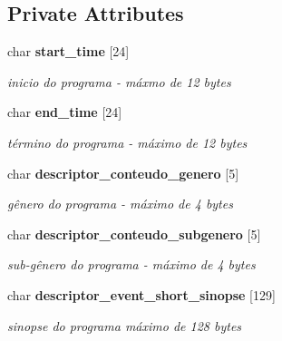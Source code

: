 \subsection*{Private Attributes}
\begin{CompactItemize}
\item 
char {\bf start\_\-time} [24]\label{classbr_1_1ufscar_1_1lince_1_1ginga_1_1recommender_1_1eit_162d6bf0bd2ed5980e8383fa3e7bc3ae}

\begin{CompactList}\small\item\em inicio do programa - máxmo de 12 bytes \item\end{CompactList}\item 
char {\bf end\_\-time} [24]\label{classbr_1_1ufscar_1_1lince_1_1ginga_1_1recommender_1_1eit_6b3d4dbec9451fa4f8452c286c6baa37}

\begin{CompactList}\small\item\em término do programa - máximo de 12 bytes \item\end{CompactList}\item 
char {\bf descriptor\_\-conteudo\_\-genero} [5]\label{classbr_1_1ufscar_1_1lince_1_1ginga_1_1recommender_1_1eit_6425408a35ba7fe43f922c52ca7e88a1}

\begin{CompactList}\small\item\em gênero do programa - máximo de 4 bytes \item\end{CompactList}\item 
char {\bf descriptor\_\-conteudo\_\-subgenero} [5]\label{classbr_1_1ufscar_1_1lince_1_1ginga_1_1recommender_1_1eit_9965d270160e6f06ecb05c94f2447d59}

\begin{CompactList}\small\item\em sub-gênero do programa - máximo de 4 bytes \item\end{CompactList}\item 
char {\bf descriptor\_\-event\_\-short\_\-sinopse} [129]\label{classbr_1_1ufscar_1_1lince_1_1ginga_1_1recommender_1_1eit_53927af17d39baa8daecc72f2f5f521f}

\begin{CompactList}\small\item\em sinopse do programa máximo de 128 bytes \item\end{CompactList}\end{CompactItemize}


